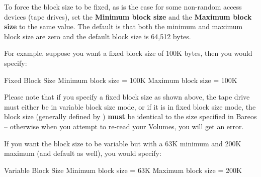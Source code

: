 \begin{description}
To force the block size to be fixed, as is the case for some non-random
access devices (tape drives), set the {\bf Minimum block size} and the
{\bf Maximum block size} to the same value.  The default
is that both the minimum and maximum block size are zero and the default
block size is 64,512 bytes.

For  example, suppose you want a fixed block size of 100K bytes, then you
would specify:

\begin{bconfig}{Fixed Block Size}
Minimum block size = 100K
Maximum block size = 100K
\end{bconfig}

Please note that if you specify a fixed block size as shown above,  the tape
drive must either be in variable block size mode, or  if it is in fixed block
size mode, the block size (generally  defined by ) {\bf must} be
identical to the size specified  in Bareos -- otherwise when you attempt to
re-read your Volumes,  you will get an error.

If you want the  block size to be variable but with a 63K minimum and 200K
maximum (and  default as well), you would specify:

\begin{bconfig}{Variable Block Size}
Minimum block size =  63K
Maximum block size = 200K
\end{bconfig}




\end{description}
